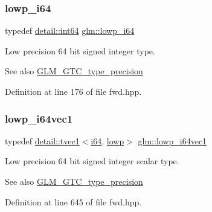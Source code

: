 \subsubsection{\texorpdfstring{lowp\+\_\+i64}{lowp\_i64}}
{\footnotesize\ttfamily typedef \hyperlink{namespaceglm_1_1detail_a5b1c3227ec636c24a0676746381adfc8}{detail\+::int64} \hyperlink{group__gtc__type__precision_ga1f4ded25f71c0f3b4518936d50b54b6e}{glm\+::lowp\+\_\+i64}}

Low precision 64 bit signed integer type. \begin{DoxySeeAlso}{See also}
\hyperlink{group__gtc__type__precision}{G\+L\+M\+\_\+\+G\+T\+C\+\_\+type\+\_\+precision} 
\end{DoxySeeAlso}


Definition at line 176 of file fwd.\+hpp.

\mbox{\label{group__gtc__type__precision_gaf427ced1906a1788fdd9faab2e57c60a}} 
\subsubsection{\texorpdfstring{lowp\+\_\+i64vec1}{lowp\_i64vec1}}
{\footnotesize\ttfamily typedef \hyperlink{structglm_1_1detail_1_1tvec1}{detail\+::tvec1}$<$\hyperlink{group__gtc__type__precision_gac7a7eaad46064fc952b06df33689da23}{i64}, \hyperlink{namespaceglm_a0f04f086094c747d227af4425893f545ae161af3fc695e696ce3bf69f7332bc2d}{lowp}$>$ \hyperlink{group__gtc__type__precision_gaf427ced1906a1788fdd9faab2e57c60a}{glm\+::lowp\+\_\+i64vec1}}

Low precision 64 bit signed integer scalar type. \begin{DoxySeeAlso}{See also}
\hyperlink{group__gtc__type__precision}{G\+L\+M\+\_\+\+G\+T\+C\+\_\+type\+\_\+precision} 
\end{DoxySeeAlso}


Definition at line 645 of file fwd.\+hpp.

\mbox{\label{group__gtc__type__precision_gad88a04aaa07fabf57fdbad8e6b7bcc9c}} 

